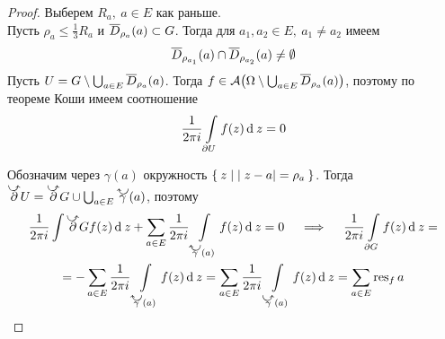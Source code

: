 \begin{proof}
	Выберем $ R_a, ~ a \in E $ как раньше. \\
	Пусть $ \rho_a \le \frac13 R_a $ и $ \overline D_{\rho_a}(a) \subset G $. Тогда для $ a_1, a_2 \in E, ~ a_1 \ne a_2 $ имеем
	$$ \overline D_{\rho_{a_1}}(a) \cap \overline D_{\rho_{a_2}}(a) \ne \emptyset $$
	Пусть $ U = G \setminus \bigcup_{a \in E} \overline D_{\rho_a}(a) $.
	Тогда $ f \in \mathcal A \big( \Omega \setminus \bigcup_{a \in E} \overline D_{\rho_a}(a) \big) $, поэтому по теореме Коши имеем соотношение
	$$ \frac1{2\pi i} \int\limits_{\partial U} f(z) \operatorname{d}^{} z = 0 $$

	Обозначим через $ \gamma(a) $ окружность $ \Set{z \mid |z - a| = \rho_a} $. Тогда $ \curvedir \partial U = \curvedir \partial G \cup \bigcup_{a \in E} \curvedir[0] \gamma(a) $, поэтому
	\begin{multline*}
		\frac1{2\pi i} \int\limits{\curvedir\partial G} f(z) \di z + \sum_{a \in E} 	\frac1{2\pi i} \int\limits_{\curvedir[0]\gamma(a)} f(z) \di z = 0 \quad \implies \quad \frac1{2\pi i} \int\limits_{\partial G} f(z) \di z = \\
		= - \sum_{a \in E} \frac1{2\pi i} \int\limits_{\curvedir[0]\gamma(a)} f(z) \di z = \sum_{a \in E} \frac1{2\pi i} \int\limits_{\curvedir \gamma(a)} f(z) \di z = \sum_{a \in E} \res_f a
	\end{multline*}
\end{proof}
